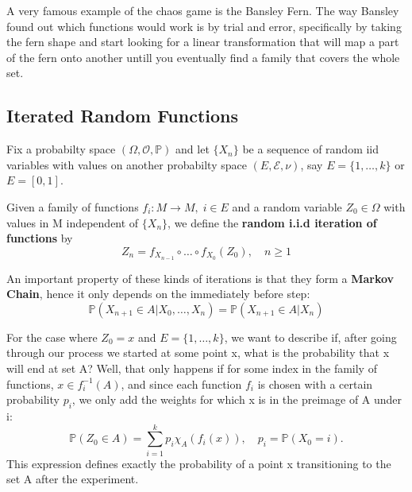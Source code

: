 \documentclass[../stationary_ifs.tex]{subfiles}
\begin{document}
\begin{example}
	A very famous example of the chaos game is the Bansley Fern.
	The way Bansley found out which functions would work is by trial and error, specifically by taking the fern shape and start looking for a linear transformation that will map a part of the fern
	onto another untill you eventually find a family that covers the whole set.
\end{example}

\subsection{Iterated Random Functions}

Fix a probabilty space \((\Omega , \mathcal{O}, \mathbb{P})\) and let \(\{X_{n}\}\) be a sequence of random iid variables with values on another probabilty space \((E, \mathcal{E}, \nu)\), say
\(E = \{1, \dotsc , k\}\) or \(E = [0, 1]\).

\begin{def*}
	Given a family of functions \(f_{i}:M\rightarrow M,\; i\in E\) and a random variable \(Z_{0}\in \Omega \) with values in M independent of \(\{X_{n}\}\), we define the \textbf{random i.i.d iteration of functions} by
	\[
		Z_{n} = f_{X_{n-1}}\circ \dotsc \circ f_{X_{0}}(Z_{0}), \quad n\geq 1
	\]
\end{def*}
An important property of these kinds of iterations is that they form a \textbf{Markov Chain}, hence it only depends on the immediately before step:
\[
	\mathbb{P}(X_{n+1}\in A| X_{0}, \dotsc , X_{n}) = \mathbb{P}(X_{n+1}\in A| X_{n})
\]

For the case where \(Z_{0} = x\) and \(E = \{1, \dotsc , k\}\), we want to describe if, after going through our process we started at some point x, what is the probability that x will end at set A? Well, that only happens if for some index in the family of functions,
\(x\in f_{i}^{-1}(A)\), and since each function \(f_{i}\) is chosen with a certain probability \(p_{i}\), we only add the weights for which x is in the preimage of A under i:
\[
	\mathbb{P}(Z_{0}\in A) = \sum\limits_{i=1}^{k}p_{i}\chi_{A}(f_{i}(x)), \quad p_{i} = \mathbb{P}(X_{0} = i).
\]
This expression defines exactly the probability of a point x transitioning to the set A after the experiment.
\end{document}
